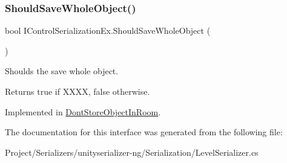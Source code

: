 \subsubsection{\texorpdfstring{Should\+Save\+Whole\+Object()}{ShouldSaveWholeObject()}}
{\footnotesize\ttfamily bool I\+Control\+Serialization\+Ex.\+Should\+Save\+Whole\+Object (\begin{DoxyParamCaption}{ }\end{DoxyParamCaption})}



Shoulds the save whole object. 

\begin{DoxyReturn}{Returns}
{\ttfamily true} if X\+X\+XX, {\ttfamily false} otherwise.
\end{DoxyReturn}


Implemented in \hyperlink{class_dont_store_object_in_room_ae64064ac5b1759f7a5694a4f617a03ed}{Dont\+Store\+Object\+In\+Room}.



The documentation for this interface was generated from the following file\+:\begin{DoxyCompactItemize}
\item 
Project/\+Serializers/unityserializer-\/ng/\+Serialization/Level\+Serializer.\+cs\end{DoxyCompactItemize}
